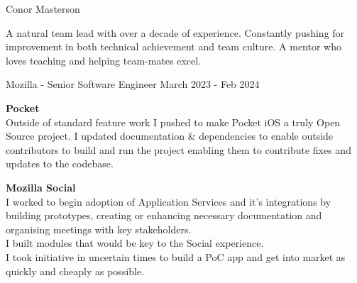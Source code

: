 \documentclass[
	10pt, %
]{FreemanCV}
\begin{document}
	
{\sffamily\Huge\noindent Conor Masterson} %
	
\medskip %
	
{\sffamily\large\noindent A natural team lead with over a decade of experience. Constantly pushing for improvement in both technical achievement and team culture. A mentor who loves teaching and helping team-mates excel.}
\medskip

\begin{paracol}{2} %


\jobentry
	{Mozilla - Senior Software Engineer}
    {March 2023 - Feb 2024}
    {\textbf{Pocket} \\ 
    Outside of standard feature work I pushed to make Pocket iOS a truly Open Source project.
    I updated documentation \& dependencies to enable outside contributors to build and run the project enabling them to contribute fixes and updates to the codebase.\par\vspace{1mm}
    \textbf{Mozilla Social} \\
    I worked to begin adoption of Application Services and it's integrations by building prototypes, creating or enhancing necessary documentation and organising meetings with key stakeholders.\\
    I built modules that would be key to the Social experience.\\
    I took initiative in uncertain times to build a PoC app and get into market as quickly and cheaply as possible.}


\end{paracol}
\end{document}
